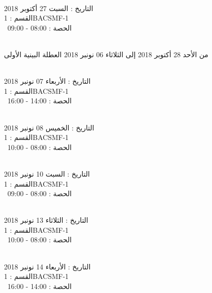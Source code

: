 \par
\noindent\makebox[\linewidth]{\rule{\paperwidth}{0.4pt}}
 \\
التاريخ : السبت 27 أكتوبر 2018 \\
القسم : 1BACSMF-1 \\
 \  
الحصة : 08:00 - 09:00 \\
\par
\noindent\makebox[\linewidth]{\rule{\paperwidth}{0.4pt}}
 \\
من الأحد 28 أكتوبر 2018 إلى الثلاثاء 06 نونبر 2018
\newline
\indent
 العطلة البينية الأولى
\par
\noindent\makebox[\linewidth]{\rule{\paperwidth}{0.4pt}}
 \\
التاريخ : الأربعاء 07 نونبر 2018 \\
القسم : 1BACSMF-1 \\
 \  
الحصة : 14:00 - 16:00 \\
\par
\noindent\makebox[\linewidth]{\rule{\paperwidth}{0.4pt}}
 \\
التاريخ : الخميس 08 نونبر 2018 \\
القسم : 1BACSMF-1 \\
 \  
الحصة : 08:00 - 10:00 \\
\par
\noindent\makebox[\linewidth]{\rule{\paperwidth}{0.4pt}}
 \\
التاريخ : السبت 10 نونبر 2018 \\
القسم : 1BACSMF-1 \\
 \  
الحصة : 08:00 - 09:00 \\
\par
\noindent\makebox[\linewidth]{\rule{\paperwidth}{0.4pt}}
 \\
التاريخ : الثلاثاء 13 نونبر 2018 \\
القسم : 1BACSMF-1 \\
 \  
الحصة : 08:00 - 10:00 \\
\par
\noindent\makebox[\linewidth]{\rule{\paperwidth}{0.4pt}}
 \\
التاريخ : الأربعاء 14 نونبر 2018 \\
القسم : 1BACSMF-1 \\
 \  
الحصة : 14:00 - 16:00 \\
